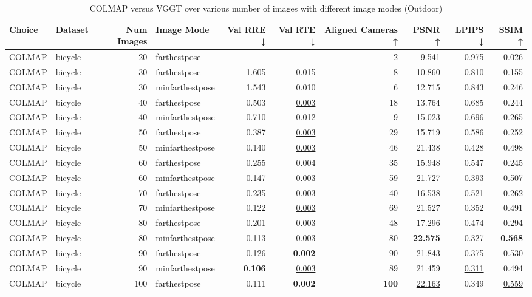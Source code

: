 \begin{table}[H]
\caption{\ifdefined\customcaption \customcaption \else COLMAP versus VGGT over various number of images with different image modes (Outdoor) \fi}
\label{tab:01_num_images_image_mode_outdoor}
\centering
\scriptsize
\begin{tabular}{llrlrrrrrr}
\toprule
Choice & Dataset & Num Images & Image Mode & Val RRE ↓ & Val RTE ↓ & Aligned Cameras ↑ & PSNR ↑ & LPIPS ↓ & SSIM ↑ \\
\midrule
COLMAP & bicycle & 20 & farthestpose &  &  & 2 & 9.541 & 0.975 & 0.026 \\
COLMAP & bicycle & 30 & farthestpose & 1.605 & 0.015 & 8 & 10.860 & 0.810 & 0.155 \\
COLMAP & bicycle & 30 & minfarthestpose & 1.543 & 0.010 & 6 & 12.715 & 0.843 & 0.246 \\
COLMAP & bicycle & 40 & farthestpose & 0.503 & \underline{0.003} & 18 & 13.764 & 0.685 & 0.244 \\
COLMAP & bicycle & 40 & minfarthestpose & 0.710 & 0.012 & 9 & 15.023 & 0.696 & 0.265 \\
COLMAP & bicycle & 50 & farthestpose & 0.387 & \underline{0.003} & 29 & 15.719 & 0.586 & 0.252 \\
COLMAP & bicycle & 50 & minfarthestpose & 0.140 & \underline{0.003} & 46 & 21.438 & 0.428 & 0.498 \\
COLMAP & bicycle & 60 & farthestpose & 0.255 & 0.004 & 35 & 15.948 & 0.547 & 0.245 \\
COLMAP & bicycle & 60 & minfarthestpose & 0.147 & \underline{0.003} & 59 & 21.727 & 0.393 & 0.507 \\
COLMAP & bicycle & 70 & farthestpose & 0.235 & \underline{0.003} & 40 & 16.538 & 0.521 & 0.262 \\
COLMAP & bicycle & 70 & minfarthestpose & 0.122 & \underline{0.003} & 69 & 21.527 & 0.352 & 0.491 \\
COLMAP & bicycle & 80 & farthestpose & 0.201 & \underline{0.003} & 48 & 17.296 & 0.474 & 0.294 \\
COLMAP & bicycle & 80 & minfarthestpose & 0.113 & \underline{0.003} & 80 & \textbf{22.575} & 0.327 & \textbf{0.568} \\
COLMAP & bicycle & 90 & farthestpose & 0.126 & \textbf{0.002} & 90 & 21.843 & 0.375 & 0.530 \\
COLMAP & bicycle & 90 & minfarthestpose & \textbf{0.106} & \underline{0.003} & 89 & 21.459 & \underline{0.311} & 0.494 \\
COLMAP & bicycle & 100 & farthestpose & 0.111 & \textbf{0.002} & \textbf{100} & \underline{22.163} & 0.349 & \underline{0.559} \\

\end{tabular}
\end{table}
